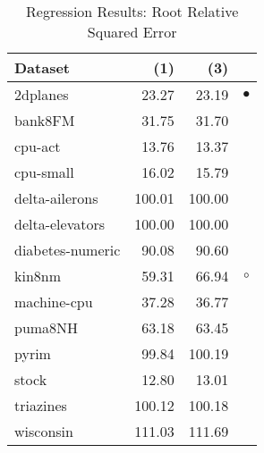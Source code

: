 \documentclass{article}
\begin{document}
\begin{table}[H]
\caption{\label{labelname}Regression Results: Root Relative Squared Error}
\footnotesize
{\centering \begin{tabular}{lrr@{\hspace{0.1cm}}c}
\\
\hline
Dataset & (1)& (3) & \\
\hline
2dplanes &  23.27 &  23.19 & $\bullet$\\
bank8FM &  31.75 &  31.70 &          \\
cpu-act &  13.76 &  13.37 &          \\
cpu-small &  16.02 &  15.79 &          \\
delta-ailerons & 100.01 & 100.00 &          \\
delta-elevators & 100.00 & 100.00 &          \\
diabetes-numeric &  90.08 &  90.60 &          \\
kin8nm &  59.31 &  66.94 &   $\circ$\\
machine-cpu &  37.28 &  36.77 &          \\
puma8NH &  63.18 &  63.45 &          \\
pyrim &  99.84 & 100.19 &          \\
stock &  12.80 &  13.01 &          \\
triazines & 100.12 & 100.18 &          \\
wisconsin & 111.03 & 111.69 &          \\
\hline
\end{tabular} \footnotesize \par}
\end{table}
\end{document}
